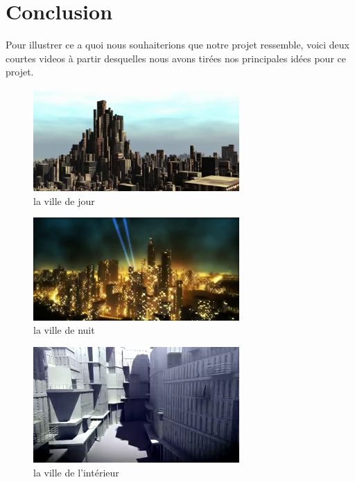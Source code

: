 \documentclass[a4paper,11pt]{article}
\begin{document}
\section*{Conclusion}

Pour illustrer ce a quoi nous souhaiterions que notre projet ressemble, voici deux courtes videos à partir desquelles nous avons tirées nos principales idées pour ce projet.
\begin{figure}[h!]
  \centering

\includegraphics[width=0.7\textwidth]{images/shot0003.png}
  \caption{la ville de jour}
  \label{fig:villes1}
\end{figure}
\begin{figure}[h!]
  \centering

\includegraphics[width=0.7\textwidth]{images/shot0005.png}
  \caption{la ville de nuit}
  \label{fig:villes2}
\end{figure}
\begin{figure}[h!]
  \centering

\includegraphics[width=0.7\textwidth]{images/shot0006.png}
  \caption{la ville de l'intérieur}
  \label{fig:villes3}
\end{figure}

\end{document}
